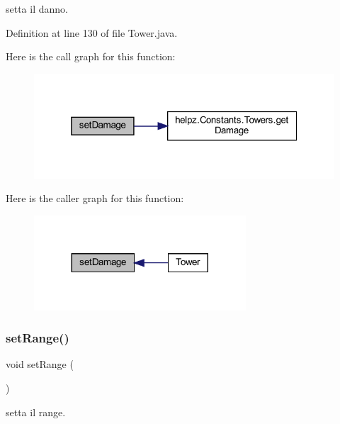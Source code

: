 setta il danno. 



Definition at line 130 of file Tower.\+java.

Here is the call graph for this function\+:\nopagebreak
\begin{figure}[H]
\begin{center}
\leavevmode
\includegraphics[width=319pt]{classtowers_1_1_tower_a342d428cb4c655ed4d92a2c5be287e5d_cgraph}
\end{center}
\end{figure}
Here is the caller graph for this function\+:\nopagebreak
\begin{figure}[H]
\begin{center}
\leavevmode
\includegraphics[width=224pt]{classtowers_1_1_tower_a342d428cb4c655ed4d92a2c5be287e5d_icgraph}
\end{center}
\end{figure}
\mbox{\label{classtowers_1_1_tower_abfc55d980923d42001e5aefda77849f9}} 
\subsubsection{\texorpdfstring{set\+Range()}{setRange()}}
{\footnotesize\ttfamily void set\+Range (\begin{DoxyParamCaption}{ }\end{DoxyParamCaption})\hspace{0.3cm}{\ttfamily [private]}}



setta il range. 



